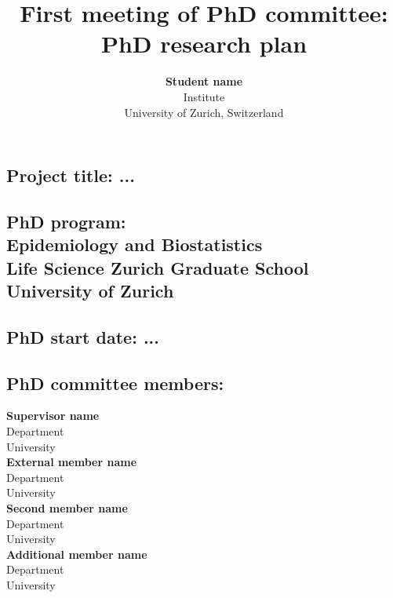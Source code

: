 \documentclass[a4paper,12pt]{article}
\title{First meeting of PhD committee: PhD research plan}
\author{\textbf{Student name} \\
	Institute \\
	University of Zurich, Switzerland}
\date{\displaydate{date}}
\begin{document}
\begin{titlepage}
\maketitle
\thispagestyle{empty}

\vspace{1mm}
\subsection*{Project title: ...}
\vspace{6mm}
\subsection*{PhD program: \\
	\textnormal{Epidemiology and Biostatistics \\
	Life Science Zurich Graduate School \\
	University of Zurich}}
\vspace{6mm}
\subsection*{PhD start date: \textnormal{...}}
\vspace{24mm}

\subsection*{PhD committee members:}
\begin{multicols}{2}
	\noindent
	\textbf{Supervisor name} \\
	Department \\
	University \\
	
	\noindent
	\textbf{External member name} \\
	Department \\
	University \\
	
	\noindent
	\textbf{Second member name} \\
	Department \\
	University \\
	
	\noindent
	\textbf{Additional member name} \\
	Department \\
	University \\
\end{multicols}

\end{titlepage}
\end{document}

